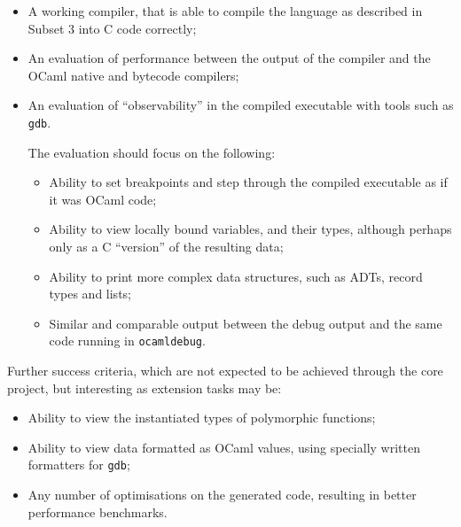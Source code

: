 \begin{itemize}

    \item A working compiler, that is able to compile the language as described
        in Subset 3 into C code correctly;

    \item An evaluation of performance between the output of the compiler and
        the OCaml native and bytecode compilers;

    \item An evaluation of ``observability'' in the compiled executable with
        tools such as \texttt{gdb}. 

        The evaluation should focus on the following:

        \begin{itemize}

            \item Ability to set breakpoints and step through the compiled
                executable as if it was OCaml code;

            \item Ability to view locally bound variables, and their types,
                although perhaps only as a C ``version'' of the resulting data;

            \item Ability to print more complex data structures, such as ADTs,
                record types and lists;

            \item Similar and comparable output between the debug output and
                the same code running in \texttt{ocamldebug}.

        \end{itemize}

\end{itemize}

Further success criteria, which are not expected to be achieved through the
core project, but interesting as extension tasks may be:

\begin{itemize}

    \item Ability to view the instantiated types of polymorphic functions;

    \item Ability to view data formatted as OCaml values, using specially
        written formatters for \texttt{gdb};

    \item Any number of optimisations on the generated code, resulting in
        better performance benchmarks.

\end{itemize}

